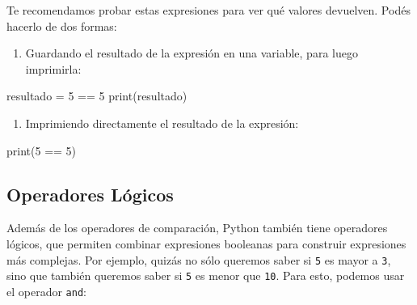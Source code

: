 \documentclass[
  letterpaper,
  DIV=11,
  numbers=noendperiod]{scrreprt}
\newenvironment{Shaded}{\begin{snugshade}}{\end{snugshade}}
\newcommand{\BuiltInTok}[1]{\textcolor[rgb]{0.00,0.23,0.31}{#1}}
\newcommand{\DecValTok}[1]{\textcolor[rgb]{0.68,0.00,0.00}{#1}}
\newcommand{\NormalTok}[1]{\textcolor[rgb]{0.00,0.23,0.31}{#1}}
\newcommand{\OperatorTok}[1]{\textcolor[rgb]{0.37,0.37,0.37}{#1}}
\providecommand{\tightlist}{%
  \setlength{\itemsep}{0pt}\setlength{\parskip}{0pt}}\usepackage{longtable,booktabs,array}
\begin{document}
\begin{tcolorbox}[enhanced jigsaw, colframe=quarto-callout-tip-color-frame, opacityback=0, opacitybacktitle=0.6, bottomrule=.15mm, toprule=.15mm, coltitle=black, breakable, colback=white, leftrule=.75mm, titlerule=0mm, bottomtitle=1mm, toptitle=1mm, rightrule=.15mm, title=\textcolor{quarto-callout-tip-color}{\faLightbulb}\hspace{0.5em}{Tip}, arc=.35mm, left=2mm, colbacktitle=quarto-callout-tip-color!10!white]

Te recomendamos probar estas expresiones para ver qué valores devuelven.
Podés hacerlo de dos formas:

\begin{enumerate}
\def\labelenumi{\arabic{enumi}.}
\tightlist
\item
  Guardando el resultado de la expresión en una variable, para luego
  imprimirla:
\end{enumerate}

\begin{Shaded}
\begin{Highlighting}[]
\NormalTok{resultado }\OperatorTok{=} \DecValTok{5} \OperatorTok{==} \DecValTok{5}
\BuiltInTok{print}\NormalTok{(resultado)}
\end{Highlighting}
\end{Shaded}

\begin{enumerate}
\def\labelenumi{\arabic{enumi}.}
\setcounter{enumi}{1}
\tightlist
\item
  Imprimiendo directamente el resultado de la expresión:
\end{enumerate}

\begin{Shaded}
\begin{Highlighting}[]
\BuiltInTok{print}\NormalTok{(}\DecValTok{5} \OperatorTok{==} \DecValTok{5}\NormalTok{)}
\end{Highlighting}
\end{Shaded}

\end{tcolorbox}

\hypertarget{operadores-luxf3gicos}{%
\subsection{Operadores Lógicos}\label{operadores-luxf3gicos}}

Además de los operadores de comparación, Python también tiene operadores
lógicos, que permiten combinar expresiones booleanas para construir
expresiones más complejas. Por ejemplo, quizás no sólo queremos saber si
\texttt{5} es mayor a \texttt{3}, sino que también queremos saber si
\texttt{5} es menor que \texttt{10}. Para esto, podemos usar el operador
\texttt{and}:
\end{document}
